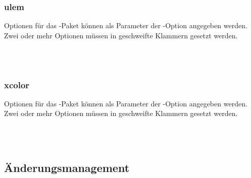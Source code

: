 \subsubsection{ulem}

Optionen für das -Paket können als Parameter der -Option angegeben werden.
Zwei oder mehr Optionen müssen in geschweifte Klammern gesetzt werden.

\begin{chusage}
		\>\\
	\usageexample
		\>\\
		\>
\end{chusage}

\subsubsection{xcolor}

Optionen für das -Paket können als Parameter der -Option angegeben werden.
Zwei oder mehr Optionen müssen in geschweifte Klammern gesetzt werden.

\begin{chusage}
		\>\\
	\usageexample
		\>\\
		\>
\end{chusage}


\subsection{Änderungsmanagement}
\label{sec:user:changemanagement}

\subsubsection{}
\DescribeMacro{\added}

